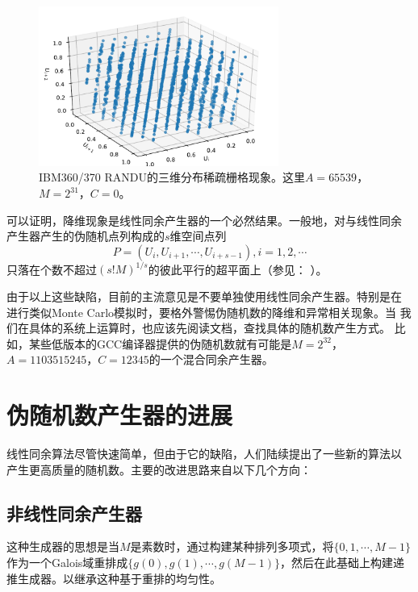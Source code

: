 \begin{figure}[!ht]
\centering
\includegraphics[width=0.7\textwidth]{images/RANDU_fail.pdf}
\caption{IBM360/370 RANDU的三维分布稀疏栅格现象。这里$A = 65539$，$M =
  2^{31}$，$C = 0$。}
\label{fig::RANDU_fail}
\end{figure}

可以证明，降维现象是线性同余产生器的一个必然结果。一般地，对与线性同余
产生器产生的伪随机点列构成的$s$维空间点列
\begin{equation}
  P = (U_i, U_{i + 1}, \cdots, U_{i + s - 1}), i = 1, 2, \cdots
  \label{eq::mul_mod_mul_dim_fail}
\end{equation}
只落在个数不超过$(s!M)^{1/s}$的彼此平行的超平面上（参见：
  \cite{Marsaglia1968Random}）。

由于以上这些缺陷，目前的主流意见是不要单独使用线性同余产生器。特别是在
进行类似Monte Carlo模拟时，要格外警惕伪随机数的降维和异常相关现象。当
我们在具体的系统上运算时，也应该先阅读文档，查找具体的随机数产生方式。
比如，某些低版本的GCC编译器提供的伪随机数就有可能是$M = 2^{32}$，$A =
1103515245$，$C = 12345$的一个混合同余产生器。

\section{伪随机数产生器的进展}

线性同余算法尽管快速简单，但由于它的缺陷，人们陆续提出了一些新的算法以
产生更高质量的随机数。主要的改进思路来自以下几个方向：

\subsection{非线性同余产生器}
这种生成器的思想是当$M$是素数时，通过构建某种排列多项式，将$\{0, 1,
\cdots, M -1\}$作为一个Galois域重排成$\{g(0), g(1), \cdots, g(M -
1)\}$，然后在此基础上构建递推生成器。以继承这种基于重排的均匀性。

